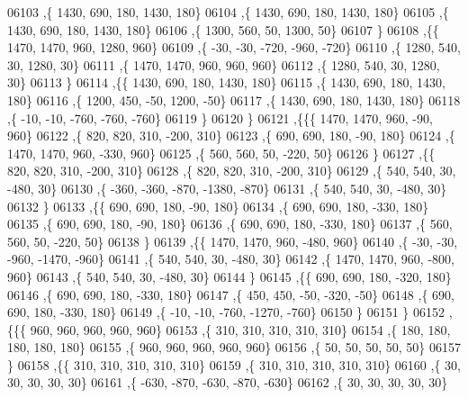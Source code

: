 \begin{DoxyCode}
06103     ,\{  1430,   690,   180,  1430,   180\}
06104     ,\{  1430,   690,   180,  1430,   180\}
06105     ,\{  1430,   690,   180,  1430,   180\}
06106     ,\{  1300,   560,    50,  1300,    50\}
06107     \}
06108    ,\{\{  1470,  1470,   960,  1280,   960\}
06109     ,\{   -30,   -30,  -720,  -960,  -720\}
06110     ,\{  1280,   540,    30,  1280,    30\}
06111     ,\{  1470,  1470,   960,   960,   960\}
06112     ,\{  1280,   540,    30,  1280,    30\}
06113     \}
06114    ,\{\{  1430,   690,   180,  1430,   180\}
06115     ,\{  1430,   690,   180,  1430,   180\}
06116     ,\{  1200,   450,   -50,  1200,   -50\}
06117     ,\{  1430,   690,   180,  1430,   180\}
06118     ,\{   -10,   -10,  -760,  -760,  -760\}
06119     \}
06120    \}
06121   ,\{\{\{  1470,  1470,   960,   -90,   960\}
06122     ,\{   820,   820,   310,  -200,   310\}
06123     ,\{   690,   690,   180,   -90,   180\}
06124     ,\{  1470,  1470,   960,  -330,   960\}
06125     ,\{   560,   560,    50,  -220,    50\}
06126     \}
06127    ,\{\{   820,   820,   310,  -200,   310\}
06128     ,\{   820,   820,   310,  -200,   310\}
06129     ,\{   540,   540,    30,  -480,    30\}
06130     ,\{  -360,  -360,  -870, -1380,  -870\}
06131     ,\{   540,   540,    30,  -480,    30\}
06132     \}
06133    ,\{\{   690,   690,   180,   -90,   180\}
06134     ,\{   690,   690,   180,  -330,   180\}
06135     ,\{   690,   690,   180,   -90,   180\}
06136     ,\{   690,   690,   180,  -330,   180\}
06137     ,\{   560,   560,    50,  -220,    50\}
06138     \}
06139    ,\{\{  1470,  1470,   960,  -480,   960\}
06140     ,\{   -30,   -30,  -960, -1470,  -960\}
06141     ,\{   540,   540,    30,  -480,    30\}
06142     ,\{  1470,  1470,   960,  -800,   960\}
06143     ,\{   540,   540,    30,  -480,    30\}
06144     \}
06145    ,\{\{   690,   690,   180,  -320,   180\}
06146     ,\{   690,   690,   180,  -330,   180\}
06147     ,\{   450,   450,   -50,  -320,   -50\}
06148     ,\{   690,   690,   180,  -330,   180\}
06149     ,\{   -10,   -10,  -760, -1270,  -760\}
06150     \}
06151    \}
06152   ,\{\{\{   960,   960,   960,   960,   960\}
06153     ,\{   310,   310,   310,   310,   310\}
06154     ,\{   180,   180,   180,   180,   180\}
06155     ,\{   960,   960,   960,   960,   960\}
06156     ,\{    50,    50,    50,    50,    50\}
06157     \}
06158    ,\{\{   310,   310,   310,   310,   310\}
06159     ,\{   310,   310,   310,   310,   310\}
06160     ,\{    30,    30,    30,    30,    30\}
06161     ,\{  -630,  -870,  -630,  -870,  -630\}
06162     ,\{    30,    30,    30,    30,    30\}

\end{DoxyCode}
